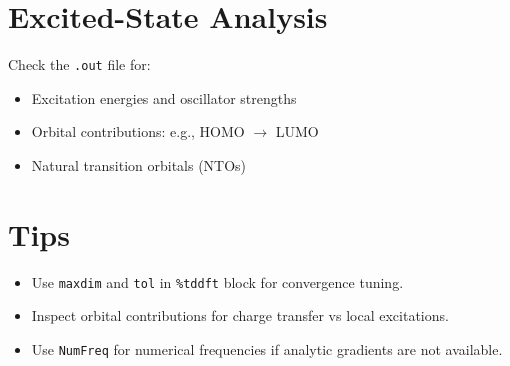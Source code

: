 \section{Excited-State Analysis}

Check the \texttt{.out} file for:

\begin{itemize}
  \item Excitation energies and oscillator strengths
  \item Orbital contributions: e.g., HOMO $\rightarrow$ LUMO
  \item Natural transition orbitals (NTOs)
\end{itemize}

\section{Tips}

\begin{itemize}
  \item Use \texttt{maxdim} and \texttt{tol} in \texttt{\%tddft} block for convergence tuning.
  \item Inspect orbital contributions for charge transfer vs local excitations.
  \item Use \texttt{NumFreq} for numerical frequencies if analytic gradients are not available.
\end{itemize}